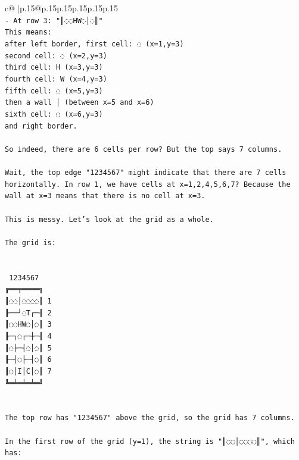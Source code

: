 \documentclass{article}
\begin{document}
{\begin{supertabular}{c@{$\;$}|p{.15\linewidth}@{}p{.15\linewidth}p{.15\linewidth}p{.15\linewidth}p{.15\linewidth}p{.15\linewidth}}
{{{\\ 
\texttt{{-} At row 3: "║◌◌HW◌│◌║"} \\
\texttt{This means: } \\
\texttt{after left border, first cell: ◌ (x=1,y=3)} \\
\texttt{second cell: ◌ (x=2,y=3)} \\
\texttt{third cell: H (x=3,y=3)} \\
\texttt{fourth cell: W (x=4,y=3)} \\
\texttt{fifth cell: ◌ (x=5,y=3)} \\
\texttt{then a wall │ (between x=5 and x=6)} \\
\texttt{sixth cell: ◌ (x=6,y=3)} \\
\texttt{and right border.} \\
\\ 
\texttt{So indeed, there are 6 cells per row? But the top says 7 columns.} \\
\\ 
\texttt{Wait, the top edge "1234567" might indicate that there are 7 cells horizontally. In row 1, we have cells at x=1,2,4,5,6,7? Because the wall at x=3 means that there is no cell at x=3.} \\
\\ 
\texttt{This is messy. Let's look at the grid as a whole.} \\
\\ 
\texttt{The grid is:} \\
\\ 
\\ 
\texttt{ 1234567} \\
\texttt{╔══╤════╗} \\
\texttt{║◌◌│◌◌◌◌║ 1} \\
\texttt{╟──┘◌T┌─╢ 2} \\
\texttt{║◌◌HW◌│◌║ 3} \\
\texttt{╟─┐◌┌─┼─╢ 4} \\
\texttt{║◌├─┤◌│◌║ 5} \\
\texttt{╟─┤◌├─┤◌║ 6} \\
\texttt{║◌│I│C│◌║ 7} \\
\texttt{╚═╧═╧═╧═╝} \\
\\ 
\\ 
\texttt{The top row has "1234567" above the grid, so the grid has 7 columns.} \\
\\ 
\texttt{In the first row of the grid (y=1), the string is "║◌◌│◌◌◌◌║", which has:} \\
}}}
\end{supertabular}}
\end{document}
